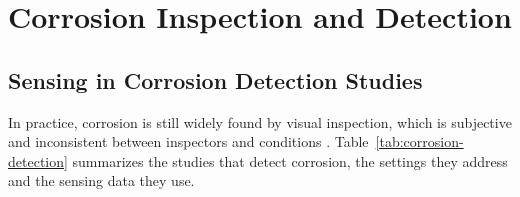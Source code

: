 \section{Corrosion Inspection and Detection}
\label{sec:lr-corrosion-detection}

\subsection{Sensing in Corrosion Detection Studies}

In practice, corrosion is still widely found by visual inspection, which is
subjective and inconsistent between inspectors and conditions \citep{Espinoza2026,Savino2025}. Table~\ref{tab:corrosion-detection} summarizes the studies
that detect corrosion, the settings they address and the sensing data they use.


